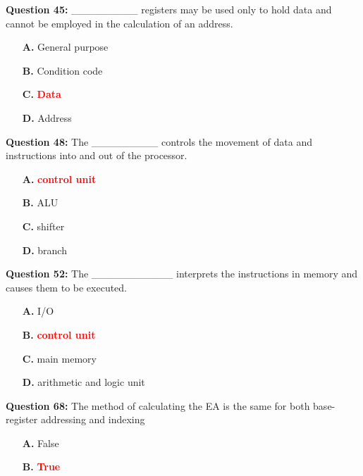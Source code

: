 \documentclass[12pt,a4paper]{article}
\begin{document}
\vspace{0.5cm}

\textbf{Question 45:} _________ registers may be used only to hold data and cannot be employed in the calculation of an address.

\begin{itemize}
    \item[\textbf{A.}] General purpose
    \item[\textbf{B.}] Condition code
    \item[\textbf{C.}] \textcolor{red}{\textbf{Data}}
    \item[\textbf{D.}] Address
\end{itemize}

\vspace{0.5cm}

\textbf{Question 48:} The _________ controls the movement of data and instructions into and out of the processor.

\begin{itemize}
    \item[\textbf{A.}] \textcolor{red}{\textbf{control unit}}
    \item[\textbf{B.}] ALU
    \item[\textbf{C.}] shifter
    \item[\textbf{D.}] branch
\end{itemize}

\vspace{0.5cm}

\textbf{Question 52:} The ___________ interprets the instructions in memory and causes them to be executed.

\begin{itemize}
    \item[\textbf{A.}] I/O
    \item[\textbf{B.}] \textcolor{red}{\textbf{control unit}}
    \item[\textbf{C.}] main memory
    \item[\textbf{D.}] arithmetic and logic unit
\end{itemize}

\vspace{0.5cm}

\textbf{Question 68:} The method of calculating the EA is the same for both base-register addressing and indexing

\begin{itemize}
    \item[\textbf{A.}] False
    \item[\textbf{B.}] \textcolor{red}{\textbf{True}}
\end{itemize}
\end{document}
